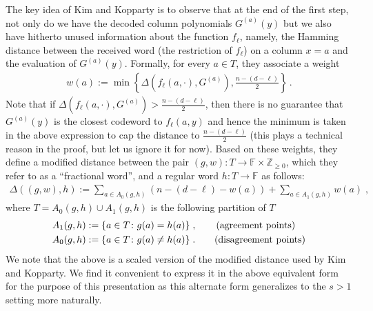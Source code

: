 \documentclass{theoretics}
\def\Integer{\mathbb{Z}}
\def\Field{\mathbb{F}}
\let\Z\Integer
\let\F\Field
\begin{document}
	The key idea of Kim and Kopparty is to observe that at the end of the
	first step, not only do we have the decoded column polynomials
	$G^{(a)}(y)$ but we also have hitherto unused  information about
	the function $f_{\ell}$, namely, the Hamming distance between the
	received word (the restriction of $f_{\ell}$) on a column $x = a$ and
	the evaluation of $G^{(a)}(y)$.
	Formally, for every $a \in T$, they associate a
	weight
	\begin{align}
		w(a) := \min\left\{{\Delta\left(f_{\ell}(a, \cdot), G^{(a)}\right)},\frac{n
			-(d-\ell)}{2}  \right\}\, .\label{eq:KKweight}
	\end{align}
	Note that if $\Delta\left(f_{\ell}(a, \cdot), G^{(a)}\right) > \frac{n
		-(d-\ell)}{2}$, then there is no guarantee that $G^{(a)}(y)$ is the
	closest codeword to $f_{\ell}(a,y)$ and hence the minimum is taken in
	the above expression to cap the distance to $\frac{n
		-(d-\ell)}{2}$ (this plays a technical reason in the proof, but let
	us ignore it for now). 
	Based on these weights, they define a modified distance between the
	pair $(g,w)\colon T \to \F \times \Z_{\geq 0}$, which they refer to as
	a ``fractional word'',  and a regular word $h \colon T \to \F$ as
	follows:
	\begin{align}
		\Delta((g,w), h) := \sum_{a \in A_0(g,h)} (n-(d-\ell) - w(a)) + \sum_{a
			\in A_1(g,h)} w(a) \;,\label{eq:KKdistance}
	\end{align}
	where $T= A_0(g,h) \cup A_1(g,h)$ is the following partition of $T$
	\begin{align*}
		A_1(g,h) &:= \{ a \in T \colon g(a) = h(a) \}\;,
		\tag*{\text{(agreement points)}}\\
		A_0(g,h) &:= \{ a \in T \colon g(a) \neq h(a)\}\;. \tag*{\text{(disagreement points)}}
	\end{align*}
	We note that the above is a scaled version of the modified distance
	used by Kim and Kopparty. We find it convenient to express it in the
	above equivalent form for the purpose of this presentation as this
	alternate form generalizes to the $s>1$ setting more naturally.
	
\end{document}

